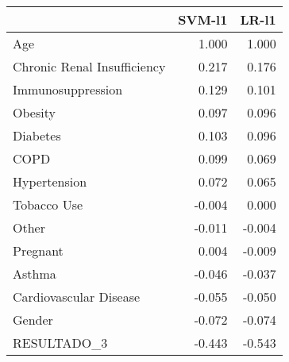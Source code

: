 \begin{tabular}{lrr}
\toprule
{} &  SVM-l1 &  LR-l1 \\
\midrule
Age                         &   1.000 &  1.000 \\
Chronic Renal Insufficiency &   0.217 &  0.176 \\
Immunosuppression           &   0.129 &  0.101 \\
Obesity                     &   0.097 &  0.096 \\
Diabetes                    &   0.103 &  0.096 \\
COPD                        &   0.099 &  0.069 \\
Hypertension                &   0.072 &  0.065 \\
Tobacco Use                 &  -0.004 &  0.000 \\
Other                       &  -0.011 & -0.004 \\
Pregnant                    &   0.004 & -0.009 \\
Asthma                      &  -0.046 & -0.037 \\
Cardiovascular Disease      &  -0.055 & -0.050 \\
Gender                      &  -0.072 & -0.074 \\
RESULTADO\_3                 &  -0.443 & -0.543 \\
\bottomrule
\end{tabular}
